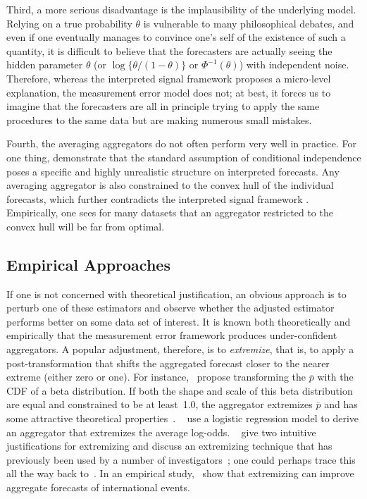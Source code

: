 \documentclass[12pt]{article}
\theoremstyle{definition}
\theoremstyle{definition}
\def\pb{\overline{p}}
\begin{document}
Third, a more serious disadvantage is the implausibility of the
underlying model. Relying on a true probability $\theta$ is vulnerable to
many philosophical debates, and even if one eventually manages to
convince one's self of the existence of such a quantity, it is
difficult to believe that the forecasters are actually seeing the
hidden parameter $\theta$ (or $\log\{\theta/(1-\theta)\}$ or
$\Phi^{-1}(\theta)$) with independent noise. Therefore, whereas the
interpreted signal framework proposes a micro-level explanation, the
measurement error model does not; at best, it forces us to imagine that
the forecasters are all in principle trying to apply the same
procedures to the same data but are making numerous small mistakes. 

Fourth, the averaging aggregators do not often perform
very well in practice. For one thing,  \citet{hong2009interpreted} demonstrate that the standard
assumption of conditional independence poses a specific and highly
unrealistic structure on interpreted forecasts. Any averaging aggregator is also constrained to
the convex hull of the individual forecasts, which further contradicts the
interpreted signal framework \citep{parunak2013characterizing}.  Empirically, one sees
for many datasets that an aggregator restricted to the convex hull
will be far from optimal. 

\subsection{Empirical Approaches}
\label{ss:empirical}

If one is not concerned with theoretical justification, an obvious
approach is to perturb one of these estimators and observe whether the
adjusted estimator performs better on some data set of interest.  It
is known both theoretically and empirically that the measurement error
framework produces under-confident aggregators.  A popular adjustment,
therefore, is to {\em extremize}, that is, to apply a
post-transformation that shifts the aggregated forecast closer to the
nearer extreme (either zero or one).  For instance,~\citet{Ranjan08}
propose transforming the $\pb$ with the CDF of a
beta distribution.  If both the shape and scale of this beta
distribution are equal and constrained to be at least~1.0, the
aggregator extremizes $\pb$ and has some attractive theoretical
properties~\citep{Wallsten2001}.  ~\citet{satopaa} use a logistic
regression model to derive an aggregator that extremizes the average
log-odds.  ~\citet{baron2014two} give two intuitive justifications for
extremizing and discuss an extremizing technique that has previously
been used by a number of investigators~\citep{Erev1994,
shlomi2010subjective}; one could perhaps trace this all the way back
to~\citet{karmarkar1978subjectively}.  In an empirical
study,~\citet{mellers2014psychological} show that extremizing can
improve aggregate forecasts of international events.
\end{document}
